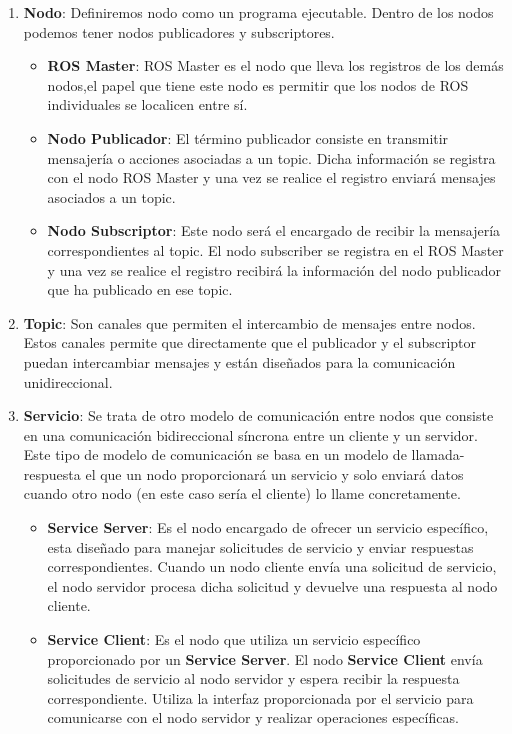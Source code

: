 \begin{enumerate}
    \item \textbf{Nodo}: Definiremos nodo como un programa ejecutable. Dentro de los nodos podemos tener nodos publicadores y subscriptores. 
        \begin{itemize}
            \item \textbf{ROS Master}: ROS Master es el nodo que lleva los registros de los demás nodos,el papel que tiene este nodo es permitir que los nodos de ROS individuales se localicen entre sí. 
            \item \textbf{Nodo Publicador}: El término publicador consiste en transmitir mensajería o acciones asociadas a un topic. 
            Dicha información se registra con el nodo ROS Master y una vez se realice el registro enviará mensajes asociados a un topic.
            \item \textbf{Nodo Subscriptor}: Este nodo será el encargado de recibir la mensajería correspondientes al topic. 
            El nodo subscriber se registra en el ROS Master y una vez se realice el registro recibirá la información del nodo publicador que ha publicado en ese topic.
        \end{itemize}
    \item \textbf{Topic}: Son canales que permiten el intercambio de mensajes entre nodos. Estos canales permite que directamente que el publicador y el subscriptor puedan intercambiar
    mensajes y están diseñados para la comunicación unidireccional.
    \item \textbf{Servicio}: Se trata de otro modelo de comunicación entre nodos que consiste en una comunicación bidireccional síncrona entre un cliente
    y un servidor. Este tipo de modelo de comunicación se basa en un modelo de llamada-respuesta el que un nodo proporcionará 
    un servicio y solo enviará datos cuando otro nodo (en este caso sería el cliente) lo llame concretamente. 
        \begin{itemize}
          \item \textbf{Service Server}: Es el nodo encargado de ofrecer un servicio específico, esta diseñado para manejar solicitudes de servicio y enviar respuestas correspondientes. Cuando un nodo cliente
                                         envía una solicitud de servicio, el nodo servidor procesa dicha solicitud y devuelve una respuesta al nodo cliente.
          \item \textbf{Service Client}: Es el nodo que utiliza un servicio específico proporcionado por un \textbf{Service Server}. El nodo \textbf{Service Client} envía solicitudes de servicio al nodo servidor y espera recibir la respuesta correspondiente.
                                         Utiliza la interfaz proporcionada por el servicio para comunicarse con el nodo servidor y realizar operaciones específicas.  
            

\end{itemize}
\end{enumerate}
